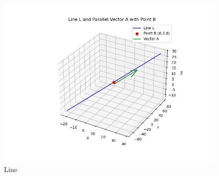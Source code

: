 \documentclass[journal]{IEEEtran}
\begin{document}
\begin{figure}[htbp]
    \centering
    \includegraphics[width=\columnwidth]{figs/fig1.png}
    \caption{Line}
    \label{fig:fig/fig1.png}
\end{figure}
\end{document}
